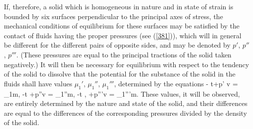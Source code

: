 \documentclass[12pt]{article}
\begin{document}
{If, therefore, a solid which is homogeneous in nature and in state of strain is bounded by six surfaces perpendicular to the principal axes of stress, the mechanical conditions of equilibrium for these surfaces may be satisfied by the contact of fluids having the proper pressures (see (\ref{381})), which will in general be different for the different pairs of opposite sides, and may be denoted by $p'$, $p''$, $p'''$. (These pressures are equal to the principal tractions of the solid taken negatively.) It will then be necessary for equilibrium with respect to the tendency of the solid to dissolve that the potential for the substance of the solid in the fluids shall have values $\mu_1'$, $\mu_1''$, $\mu_1'''$, determined by the equations
\eqs \epsilon- t\eta +p' v  = \mu_1m,     \label{393}\eqe
\eqs \epsilon-t \eta +p''v =   \mu_1''m,    \label{394}\eqe
\eqs \epsilon-t \eta, +p'''v = \mu_1'''m.    \label{395}\eqe
These values, it will be observed, are entirely determined by the nature and state of the solid, and their differences are equal to the differences of the corresponding pressures divided by the density of the solid.


}
\end{document}
